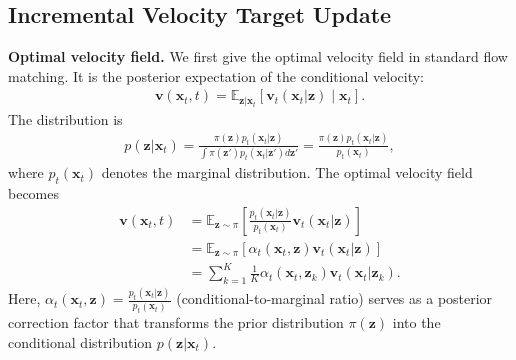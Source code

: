\documentclass{article} %
\begin{document}
\subsection{Incremental Velocity Target Update}
\noindent\textbf{Optimal velocity field.} 
We first give the optimal velocity field in standard flow matching. 
It is the posterior expectation of the conditional velocity:
\begin{align}
\mathbf{v}(\mathbf{x}_t,t)
=
\mathbb{E}_{\mathbf{z} | \mathbf{x}_t}
\left[
\mathbf{v}_t(\mathbf{x}_t|\mathbf{z})
\mid
\mathbf{x}_t
\right].
\end{align}
The distribution is
\begin{align}
p(\mathbf{z}|\mathbf{x}_t)
=
\frac{
\pi(\mathbf{z})
p_t(\mathbf{x}_t|\mathbf{z})
}
{
\int
\pi(\mathbf{z}')
p_t(\mathbf{x}_t|\mathbf{z}')
d\mathbf{z}'
} 
= 
\frac{
\pi(\mathbf{z})
p_t(\mathbf{x}_t|\mathbf{z})
}
{
p_t(\mathbf{x}_t)
},
\end{align}
where
$
p_t(\mathbf{x}_t)$
denotes the marginal distribution.
The optimal velocity field becomes
\begin{align}
\mathbf{v}(\mathbf{x}_t,t)
&= 
\mathbb{E}_{\mathbf{z}\sim\pi}
\left[
\frac{p_t(\mathbf{x}_t|\mathbf{z})}
{
p_t(\mathbf{x}_t)
}
\mathbf{v}_t(\mathbf{x}_t|\mathbf{z})
\right]
\\
&=
\mathbb{E}_{\mathbf{z}\sim\pi}
[
\alpha_t(\mathbf{x}_t,\mathbf{z})
\mathbf{v}_t(\mathbf{x}_t|\mathbf{z})
]\\
&=
\sum_{k=1}^K
\frac{1}{K}
\alpha_t(\mathbf{x}_t,\mathbf{z}_k)
\mathbf{v}_t(\mathbf{x}_t|\mathbf{z}_k)
.
\end{align}
Here, $\alpha_t(\mathbf{x}_t,\mathbf{z})
=
\frac{
p_t(\mathbf{x}_t|\mathbf{z})
}
{
p_t(\mathbf{x}_t)
}$ (conditional-to-marginal ratio) 
serves as a posterior correction
factor that transforms the prior distribution $\pi(\mathbf{z})$ into the
conditional distribution $p(\mathbf{z}|\mathbf{x}_t)$.
\end{document}
